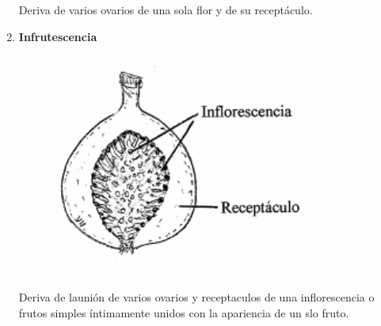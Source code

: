 \documentclass[a4paper,12pt,oneside]{book}
\begin{document}
\begin{enumerate}
Deriva de varios ovarios de una sola flor y de su receptáculo.

\item \textbf{Infrutescencia}
\label{sec:orgfd743f0}

\begin{figure}[htbp]
\centering
\includegraphics[width=0.8\textwidth]{./img_1481/infrutescencia.PNG}
\caption{}
\end{figure}

Deriva de launión de varios ovarios y receptaculos de una inflorescencia o
frutos simples íntimamente unidos con la apariencia de un slo fruto.
\end{enumerate}
\end{document}
